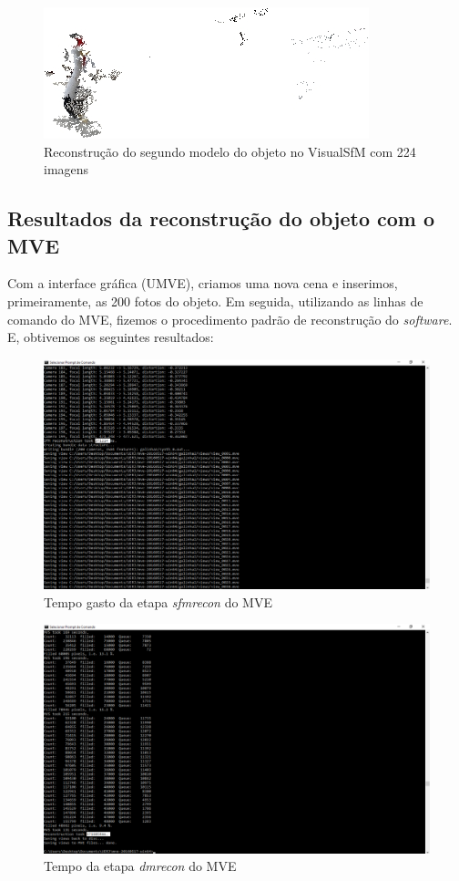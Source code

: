 \begin{figure}[!h]
	\centering
	\includegraphics[width=0.5\linewidth]{figs/galinhavisualsfm224.jpg}
	\caption{%
	Reconstrução do segundo modelo do objeto no VisualSfM com 224 imagens
	}\label{fig:reconstrucaoDensaVisualSFM2242}
\end{figure}

\subsection{Resultados da reconstrução do objeto com o MVE}

Com a interface gráfica (UMVE), criamos uma nova cena e inserimos, primeiramente, as 200 fotos do objeto. Em seguida, utilizando as linhas de comando do MVE, fizemos o procedimento padrão de reconstrução do {\it software}. E, obtivemos os seguintes resultados:

\begin{figure}[!h]
	\centering
	\includegraphics[width=0.5\linewidth]{figs/galinhalongesfmreconmve.png}
	\caption{%
	Tempo gasto da etapa {\it sfmrecon} do MVE
	}\label{fig:sfmrecon1}
\end{figure}

\begin{figure}[!h]
	\centering
	\includegraphics[width=0.5\linewidth]{figs/galinhadmreconmve.png}
	\caption{%
	Tempo da etapa {\it dmrecon} do MVE
	}\label{fig:dmrecon1}
\end{figure}

